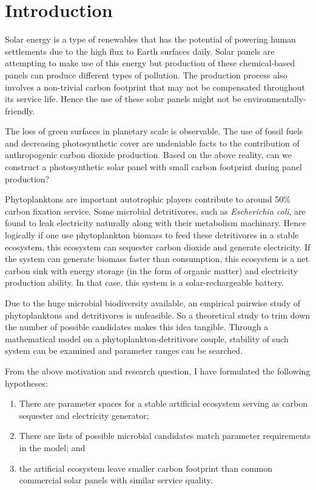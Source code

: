 \documentclass[../thesis.tex]{subfiles} %
\begin{document}
\section{Introduction}

Solar energy is a type of renewables that has the potential of powering human settlements due to the high flux to Earth surfaces daily.  Solar panels are attempting to make use of this energy but production of these chemical-based panels can produce different types of pollution.  The production process also involves a non-trivial carbon footprint that may not be compensated throughout its service life.  Hence the use of these solar panels might not be environmentally-friendly.

The loss of green surfaces in planetary scale is observable.  The use of fossil fuels and decreasing photosynthetic cover are undeniable facts to the contribution of anthropogenic carbon dioxide production.  Based on the above reality, can we construct a photosynthetic solar panel with small carbon footprint during panel production?

Phytoplanktons are important autotrophic players contribute to around 50\% carbon fixation service.  Some microbial detritivores, such as \textit{Escherichia coli}, are found to leak electricity naturally along with their metabolism machinary.  Hence logically if one use phytoplankton biomass to feed these detritivores in a stable ecosystem, this ecosystem can sequester carbon dioxide and generate electricity.  If the system can generate biomass faster than consumption, this ecosystem is a net carbon sink with energy storage (in the form of organic matter) and electricity production ability.  In that case, this system is a solar-rechargeable battery.

Due to the huge microbial biodiversity available, an empirical pairwise study of phytoplanktons and detritivores is unfeasible.  So a theoretical study to trim down the number of possible candidates makes this idea tangible.  Through a mathematical model on a phytoplankton-detritivore couple, stability of such system can be examined and parameter ranges can be searched.

From the above motivation and research question, I have formulated the following hypotheses:
\begin{enumerate}
    \item There are parameter spaces for a stable artificial ecosystem serving as carbon sequester and electricity generator;
    \item There are lists of possible microbial candidates match parameter requirements in the model; and
    \item the artificial ecosystem leave smaller carbon footprint than common commercial solar panels with similar service quality.
\end{enumerate}
\end{document}
